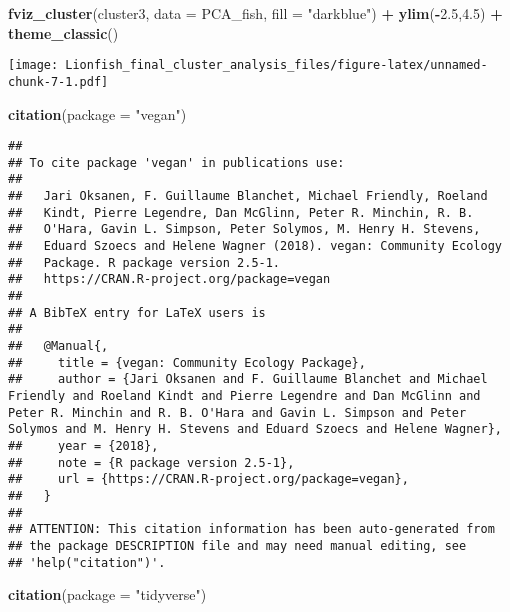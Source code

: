 \documentclass[]{article}
\newenvironment{Shaded}{\begin{snugshade}}{\end{snugshade}}
\newcommand{\KeywordTok}[1]{\textcolor[rgb]{0.13,0.29,0.53}{\textbf{#1}}}
\newcommand{\DataTypeTok}[1]{\textcolor[rgb]{0.13,0.29,0.53}{#1}}
\newcommand{\FloatTok}[1]{\textcolor[rgb]{0.00,0.00,0.81}{#1}}
\newcommand{\StringTok}[1]{\textcolor[rgb]{0.31,0.60,0.02}{#1}}
\newcommand{\OperatorTok}[1]{\textcolor[rgb]{0.81,0.36,0.00}{\textbf{#1}}}
\newcommand{\NormalTok}[1]{#1}
\begin{document}
\begin{Shaded}
\begin{Highlighting}[]
\KeywordTok{fviz_cluster}\NormalTok{(cluster3, }\DataTypeTok{data =}\NormalTok{ PCA_fish, }\DataTypeTok{fill =} \StringTok{"darkblue"}\NormalTok{) }\OperatorTok{+}\StringTok{ }\KeywordTok{ylim}\NormalTok{(}\OperatorTok{-}\FloatTok{2.5}\NormalTok{,}\FloatTok{4.5}\NormalTok{) }\OperatorTok{+}\StringTok{ }\KeywordTok{theme_classic}\NormalTok{()}
\end{Highlighting}
\end{Shaded}

\texttt{[image: Lionfish\_final\_cluster\_analysis\_files/figure-latex/unnamed-chunk-7-1.pdf]}

\begin{Shaded}
\begin{Highlighting}[]
\KeywordTok{citation}\NormalTok{(}\DataTypeTok{package =} \StringTok{"vegan"}\NormalTok{)}
\end{Highlighting}
\end{Shaded}

\begin{verbatim}
## 
## To cite package 'vegan' in publications use:
## 
##   Jari Oksanen, F. Guillaume Blanchet, Michael Friendly, Roeland
##   Kindt, Pierre Legendre, Dan McGlinn, Peter R. Minchin, R. B.
##   O'Hara, Gavin L. Simpson, Peter Solymos, M. Henry H. Stevens,
##   Eduard Szoecs and Helene Wagner (2018). vegan: Community Ecology
##   Package. R package version 2.5-1.
##   https://CRAN.R-project.org/package=vegan
## 
## A BibTeX entry for LaTeX users is
## 
##   @Manual{,
##     title = {vegan: Community Ecology Package},
##     author = {Jari Oksanen and F. Guillaume Blanchet and Michael Friendly and Roeland Kindt and Pierre Legendre and Dan McGlinn and Peter R. Minchin and R. B. O'Hara and Gavin L. Simpson and Peter Solymos and M. Henry H. Stevens and Eduard Szoecs and Helene Wagner},
##     year = {2018},
##     note = {R package version 2.5-1},
##     url = {https://CRAN.R-project.org/package=vegan},
##   }
## 
## ATTENTION: This citation information has been auto-generated from
## the package DESCRIPTION file and may need manual editing, see
## 'help("citation")'.
\end{verbatim}

\begin{Shaded}
\begin{Highlighting}[]
\KeywordTok{citation}\NormalTok{(}\DataTypeTok{package =} \StringTok{"tidyverse"}\NormalTok{)}
\end{Highlighting}
\end{Shaded}
\end{document}
